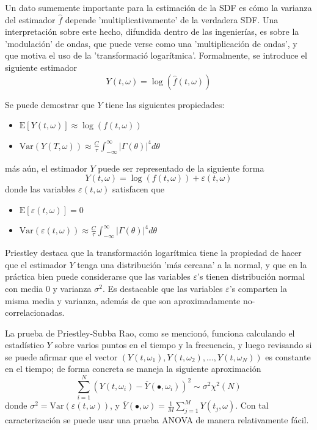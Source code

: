 \documentclass[12pt,a4paper]{mitthesis}
\newcommand{\intR}{\int_{-\infty}^{\infty}}
\newcommand{\est}[1]{\widehat{ #1 }}
\newcommand{\E}[1]{\mathrm{E}\left[ #1 \right]}
\newcommand{\Var}[1]{\mathrm{Var}\left( #1 \right)}
\newcommand{\abso}[1]{\left| #1 \right|}
\begin{document}
Un dato sumemente importante para la estimaci\'on de la SDF es c\'omo la varianza del estimador 
$\widehat{f}$ depende 'multiplicativamente' de la verdadera SDF.
Una interpretaci\'on sobre este hecho, difundida dentro de las ingenier\'ias, es sobre la 
'modulaci\'on' de ondas, que puede verse como una 'multiplicaci\'on de ondas', y que motiva el uso 
de la 'transformaci\'o logar\'itmica'.
Formalmente, se introduce el siguiente estimador
\begin{equation*}
Y(t,\omega) = \log{\left( \est{f}(t,\omega)\right)}
\end{equation*}

Se puede demostrar que $Y$ tiene las siguientes propiedades:
\begin{itemize}
\item $\displaystyle 
\E{ Y(t,\omega) } \approx \log \left( f(t,\omega) \right)$
\item $\displaystyle 
\Var{ Y(T,\omega) } 
\approx \frac{C}{\tau} \intR \abso{\Gamma (\theta)}^{4} d\theta $
\end{itemize}
m\'as a\'un, el estimador $Y$ puede ser representado de la siguiente forma
\begin{equation*}
Y(t,\omega) = \log \left( f(t,\omega) \right) + \varepsilon(t,\omega)
\end{equation*}
donde las variables $\varepsilon(t,\omega)$ satisfacen que
\begin{itemize}
\item $\displaystyle \E{\varepsilon(t,\omega)} = 0$
\item $\displaystyle \Var{\varepsilon(t,\omega)}
\approx \frac{C}{\tau} \intR \abso{\Gamma (\theta)}^{4} d\theta$
\end{itemize}

Priestley \cite{Priestley81} destaca que la transformaci\'on logar\'itmica tiene la propiedad de 
hacer que el estimador $Y$ tenga una distribuci\'on 'm\'as cercana' a la normal, y que en la 
pr\'actica bien puede considerarse que las variables $\varepsilon$'s tienen distribuci\'on normal 
con media 0 y varianza $\sigma^{2}$.
Es destacable que las variables $\varepsilon$'s comparten la misma media y varianza, adem\'as de 
que son aproximadamente no-correlacionadas.

La prueba de Priestley-Subba Rao, como se mencion\'o, funciona calculando el estad\'istico $Y$ 
sobre varios puntos en el tiempo y la frecuencia, y luego revisando si se puede afirmar que el 
vector  $\left( Y(t,\omega_1), Y(t,\omega_2), \dots, Y(t,\omega_N) \right)$ es constante en el 
tiempo; de forma concreta  se maneja la siguiente aproximaci\'on
\begin{equation*}
\sum_{i = 1 }^{N} \left( Y(t,\omega_i) - \overline{Y}(\bullet,\omega_i) \right)^{2} 
\sim \sigma^{2} \chi^{2}(N)
\end{equation*}
donde $\sigma^{2} = \Var{\varepsilon(t,\omega)}$, y
$\overline{Y}(\bullet,\omega) = \frac{1}{M} \sum_{j=1}^{M} Y(t_j,\omega)$.
Con tal caracterizaci\'on se puede usar una prueba ANOVA de manera relativamente f\'acil.
\end{document}
